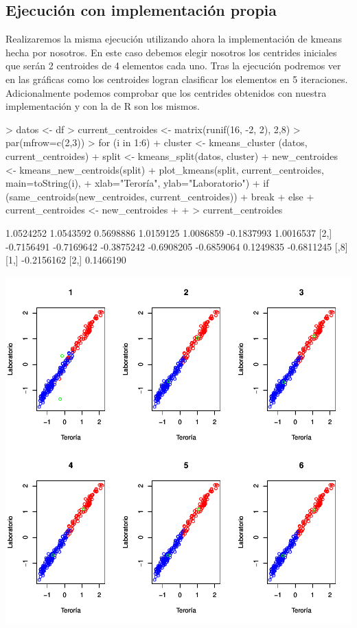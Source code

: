 \documentclass [a4paper] {article}
\begin{document}
\subsection{Ejecución con implementación propia}
Realizaremos la misma ejecución utilizando ahora la implementación de kmeans hecha por nosotros.
En este caso debemos elegir nosotros los centrides iniciales que serán 2 centroides de 4 elementos cada uno.
Tras la ejecución podremos ver en las gráficas como los centroides logran clasificar los elementos en 5 iteraciones.
Adicionalmente podemos comprobar que los centrides obtenidos con nuestra implementación y con la de R son los mismos.
\begin{center}
\begin{Schunk}
\begin{Sinput}
> datos <- df
> current_centroides <- matrix(runif(16, -2, 2), 2,8)
> par(mfrow=c(2,3))
> for (i in 1:6){
+   cluster <- kmeans_cluster (datos, current_centroides)
+   split <- kmeans_split(datos, cluster)
+   new_centroides <- kmeans_new_centroids(split)
+   plot_kmeans(split, current_centroides, main=toString(i),
+               xlab="Teroría", ylab="Laboratorio")
+   if (same_centroids(new_centroides, current_centroides)){
+     break
+   }else{
+     current_centroides <- new_centroides
+   }
+ }
> current_centroides
\end{Sinput}
\begin{Soutput}
           [,1]       [,2]       [,3]       [,4]       [,5]       [,6]       [,7]
[1,]  1.0524252  1.0543592  0.5698886  1.0159125  1.0086859 -0.1837993  1.0016537
[2,] -0.7156491 -0.7169642 -0.3875242 -0.6908205 -0.6859064  0.1249835 -0.6811245
           [,8]
[1,] -0.2156162
[2,]  0.1466190
\end{Soutput}
\end{Schunk}
\includegraphics{entrega-kmeans_our_implementation}
\end{center}
\end{document}
